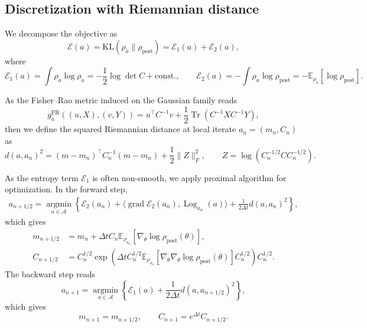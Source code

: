 \documentclass[11pt]{article}
\theoremstyle{plain}
\theoremstyle{definition}
\theoremstyle{remark}
\newcommand{\E}{\mathbb{E}}
\newcommand{\KL}{\mathrm{KL}}
\newcommand{\Tr}{\operatorname{Tr}}
\newcommand{\post}{\mathrm{post}}
\newcommand{\grad}{\operatorname{grad}}
\newcommand{\Log}{\operatorname{Log}}
\newcommand{\Aspace}{\mathcal{A}}
\begin{document}
\subsection{Discretization with Riemannian distance}

We decompose the objective as
\[
    \mathcal E(a)= \KL (\rho_a \| \rho_\post) = \mathcal E_1(a)+\mathcal E_2(a),
\]
where
\[
    \mathcal E_1(a)
    =
    \int \rho_a\log\rho_a
    =
    -\frac12\log\det C + \mathrm{const.},
    \qquad
    \mathcal E_2(a)
    =
    -\int \rho_a\log\rho_{\post}
    =
    -\mathbb E_{\rho_a}[\log\rho_{\mathrm{post}}].
\]

As the Fisher--Rao metric induced on the Gaussian family reads
\begin{equation*}
    g_a^\mathrm{FR} ((u, X), (v, Y)) = u^\top C^{-1} v + \frac{1}{2} \Tr (C^{-1} X C^{-1} Y),
\end{equation*}
then we define the squared Riemannian distance at local iterate $a_n = (m_n, C_n)$ as 
\begin{equation*}
    d (a, a_n)^2 = (m - m_n)^\top C_n^{-1} (m - m_n) + \frac{1}{2} \|Z\|_F^2, \qquad Z = \log (C_n^{-1/2}CC_n^{-1/2}).
\end{equation*}

As the entropy term $\mathcal{E}_1$ is often non-smooth, we apply proximal algorithm \cite{parikh2014proximal} for optimization. In the forward step,
\begin{align*}
    a_{n+1/2} = \operatorname*{argmin}_{a \in \Aspace} \left\{ \mathcal{E}_2 (a_n) + \langle \grad \mathcal{E}_2 (a_n), \Log_{a_n} (a) \rangle + \frac{1}{2\Delta t} d(a, a_n)^2 \right\},
\end{align*}
which gives
\begin{align*}
    m_{n+1/2} &= m_n + \Delta t C_n \E_{\rho_{a_n}} [\nabla_\theta \log \rho_\post (\theta)], \\
    C_{n+1/2} &= C_n^{1/2} \exp (\Delta t C_n^{1/2} \E_{\rho_{a_n}} [\nabla_\theta \nabla_\theta \log \rho_\post (\theta)] C_n^{1/2}) C_n^{1/2}.
\end{align*}
The backward step reads
\begin{equation*}
    a_{n+1} = \operatorname*{argmin}_{a\in \Aspace} \left\{ \mathcal{E}_1 (a) + \frac{1}{2\Delta t} d(a, a_{n+1/2})^2 \right\},
\end{equation*}
which gives
\begin{equation*}
    m_{n+1} = m_{n+1/2}, \qquad C_{n+1} = e^{\Delta t} C_{n+1/2}.
\end{equation*}
\end{document}
